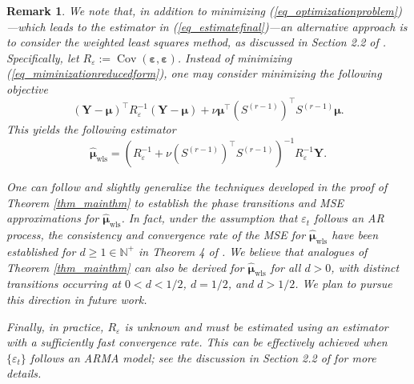 \documentclass[11pt]{article}
\newtheorem{remark}[theorem]{Remark}
\newcommand{\wls}{\mathrm{wls}}
\numberwithin{equation}{section}
\numberwithin{figure}{section}
\begin{document}
\begin{remark}\label{rem_generalizationweighted}
We note that, in addition to minimizing (\ref{eq_optimizationproblem})—which leads to the estimator in (\ref{eq_estimatefinal})—an alternative approach is to consider the weighted least squares method, as discussed in Section 2.2 of \cite{burman_shumway2009estimation}. Specifically, let $R_\varepsilon := \operatorname{Cov}(\bm{\varepsilon}, \bm{\varepsilon})$. Instead of minimizing (\ref{eq_miminizationreducedform}), one may consider minimizing the following objective
\begin{equation*}
(\bm{Y} - \bm{\mu})^\top R_\varepsilon^{-1} (\bm{Y} - \bm{\mu}) + \nu \bm{\mu}^\top (S^{(r-1)})^\top S^{(r-1)} \bm{\mu}.
\end{equation*}
This yields the following estimator
\begin{equation}\label{eq_estimtorwls}
\widehat{\bm{\mu}}_{\wls} = (R_\varepsilon^{-1} + \nu (S^{(r-1)})^\top S^{(r-1)})^{-1} R_\varepsilon^{-1} \bm{Y}.
\end{equation}  

One can follow and slightly generalize the techniques developed in the proof of Theorem \ref{thm_mainthm} to establish the phase transitions and MSE approximations for $\widehat{\bm{\mu}}_{\wls}$. In fact, under the assumption that ${\varepsilon_t}$ follows an AR process, the consistency and convergence rate of the MSE for $\widehat{\bm{\mu}}_{\wls}$ have been established for $d \geq 1 \in \mathbb{N}^+$ in Theorem 4 of \cite{burman_shumway2009estimation}. We believe that analogues of Theorem \ref{thm_mainthm} can also be derived for $\widehat{\bm{\mu}}_{\wls}$ for all $d > 0$, with distinct transitions occurring at $0 < d < 1/2$, $d = 1/2$, and $d > 1/2$. We plan to pursue this direction in future work.

Finally, in practice, $R_{\varepsilon}$ is unknown and must be estimated using an estimator with a sufficiently fast convergence rate. This can be effectively achieved when $\{\varepsilon_t\}$ follows an ARMA model; see the discussion in Section 2.2 of \cite{burman_shumway2009estimation} for more details.  



\end{remark}
\end{document}
